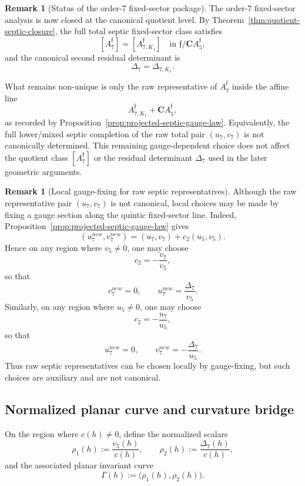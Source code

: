 \documentclass[11pt,a4paper]{amsart}
\def\new{new}%
\theoremstyle{plain}
\theoremstyle{definition}
\newtheorem{remark}[theorem]{Remark}
\newcommand{\new}{\mathrm{new}}
\begin{document}
\begin{remark}[Status of the order-$7$ fixed-sector package]
\label{rem:status-full-septic-fixed-sector}
The order-$7$ fixed-sector analysis is now closed at the canonical quotient
level. By Theorem~\ref{thm:quotient-septic-closure}, the full total septic
fixed-sector class satisfies
\[
[A_7^{\mathfrak f}]
=
[A_{7,K_1}^{\mathfrak f}]
\quad\text{in }\mathfrak f/\mathbf C A_5^{\mathfrak f},
\]
and the canonical second residual determinant is
\[
\Delta_7=\Delta_{7,K_1}.
\]

What remains non-unique is only the raw representative of $A_7^{\mathfrak f}$
inside the affine line
\[
A_{7,K_1}^{\mathfrak f}+\mathbf C A_5^{\mathfrak f},
\]
as recorded by Proposition~\ref{prop:projected-septic-gauge-law}. Equivalently,
the full lower/mixed septic completion of the raw total pair $(u_7,v_7)$ is
not canonically determined. This remaining gauge-dependent choice does not
affect the quotient class $[A_7^{\mathfrak f}]$ or the residual determinant
$\Delta_7$ used in the later geometric arguments.
\end{remark}

\begin{remark}[Local gauge-fixing for raw septic representatives]
\label{rem:local-gauge-fixing-u7-v7}
Although the raw representative pair $(u_7,v_7)$ is not canonical, local
choices may be made by fixing a gauge section along the quintic fixed-sector
line. Indeed, Proposition~\ref{prop:projected-septic-gauge-law} gives
\[
(u_7^{\new},v_7^{\new})=(u_7,v_7)+c_2(u_5,v_5).
\]
Hence on any region where $v_5\neq 0$, one may choose
\[
c_2=-\frac{v_7}{v_5},
\]
so that
\[
v_7^{\new}=0,
\qquad
u_7^{\new}=\frac{\Delta_7}{v_5}.
\]
Similarly, on any region where $u_5\neq 0$, one may choose
\[
c_2=-\frac{u_7}{u_5},
\]
so that
\[
u_7^{\new}=0,
\qquad
v_7^{\new}=-\frac{\Delta_7}{u_5}.
\]
Thus raw septic representatives can be chosen locally by gauge-fixing, but
such choices are auxiliary and are not canonical.
\end{remark}

\subsection{Normalized planar curve and curvature bridge}

On the region where $c(h)\neq 0$, define the normalized scalars
\[
\rho_1(h):=\frac{v_5(h)}{c(h)},
\qquad
\rho_2(h):=\frac{\Delta_7(h)}{c(h)},
\]
and the associated planar invariant curve
\[
\Gamma(h):=\bigl(\rho_1(h),\rho_2(h)\bigr).
\]
\end{document}
